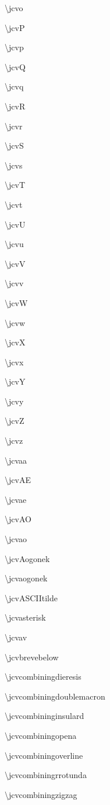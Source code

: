 \documentclass[12pt]{article}
\begin{document}
\begin{multicols}{3}
\textbackslash jcvo

\textbackslash jcvP

\textbackslash jcvp

\textbackslash jcvQ

\textbackslash jcvq

\textbackslash jcvR

\textbackslash jcvr

\textbackslash jcvS

\textbackslash jcvs

\textbackslash jcvT

\textbackslash jcvt

\textbackslash jcvU

\textbackslash jcvu

\textbackslash jcvV

\textbackslash jcvv

\textbackslash jcvW

\textbackslash jcvw

\textbackslash jcvX

\textbackslash jcvx

\textbackslash jcvY

\textbackslash jcvy

\textbackslash jcvZ

\textbackslash jcvz

\textbackslash jcvaa

\textbackslash jcvAE

\textbackslash jcvae

\textbackslash jcvAO

\textbackslash jcvao

\textbackslash jcvAogonek

\textbackslash jcvaogonek

\textbackslash jcvASCIItilde

\textbackslash jcvasterisk

\textbackslash jcvav

\textbackslash jcvbrevebelow

\textbackslash jcvcombiningdieresis

\textbackslash jcvcombiningdoublemacron

\textbackslash jcvcombininginsulard

\textbackslash jcvcombiningopena

\textbackslash jcvcombiningoverline

\textbackslash jcvcombiningrrotunda

\textbackslash jcvcombiningzigzag


\end{multicols}
\end{document}
